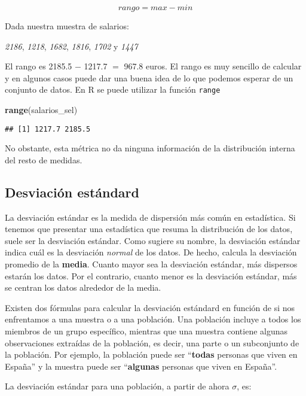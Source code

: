 \documentclass[
]{book}
\newenvironment{Shaded}{\begin{snugshade}}{\end{snugshade}}
\newcommand{\KeywordTok}[1]{\textcolor[rgb]{0.13,0.29,0.53}{\textbf{#1}}}
\newcommand{\NormalTok}[1]{#1}
\begin{document}
\[rango = max - min\]

Dada nuestra muestra de salarios:

\emph{2186}, \emph{1218}, \emph{1682}, \emph{1816}, \emph{1702} y \emph{1447}

El rango es 2185.5 \(-\) 1217.7 \(=\) 967.8 euros. El rango es muy sencillo de calcular y en algunos casos puede dar una buena idea de lo que podemos esperar de un conjunto de datos. En R se puede utilizar la función \texttt{range}

\begin{Shaded}
\begin{Highlighting}[]
\KeywordTok{range}\NormalTok{(salarios_sel)}
\end{Highlighting}
\end{Shaded}

\begin{verbatim}
## [1] 1217.7 2185.5
\end{verbatim}

No obstante, esta métrica no da ninguna información de la distribución interna del resto de medidas.

\hypertarget{desviaciuxf3n-estuxe1ndard}{%
\subsection{Desviación estándard}\label{desviaciuxf3n-estuxe1ndard}}

La desviación estándar es la medida de dispersión más común en estadística. Si tenemos que presentar una estadística que resuma la distribución de los datos, suele ser la desviación estándar. Como sugiere su nombre, la desviación estándar indica cuál es la desviación \emph{normal} de los datos. De hecho, calcula la desviación promedio de la \textbf{media}. Cuanto mayor sea la desviación estándar, más dispersos estarán los datos. Por el contrario, cuanto menor es la desviación estándar, más se centran los datos alrededor de la media.

Existen dos fórmulas para calcular la desviación estándard en función de si nos enfrentamos a una muestra o a una población. Una población incluye a todos los miembros de un grupo específico, mientras que una muestra contiene algunas observaciones extraídas de la población, es decir, una parte o un subconjunto de la población. Por ejemplo, la población puede ser ``\textbf{todas} personas que viven en España'' y la muestra puede ser ``\textbf{algunas} personas que viven en España''.

La desviación estándar para una población, a partir de ahora \(\sigma\), es:
\end{document}
